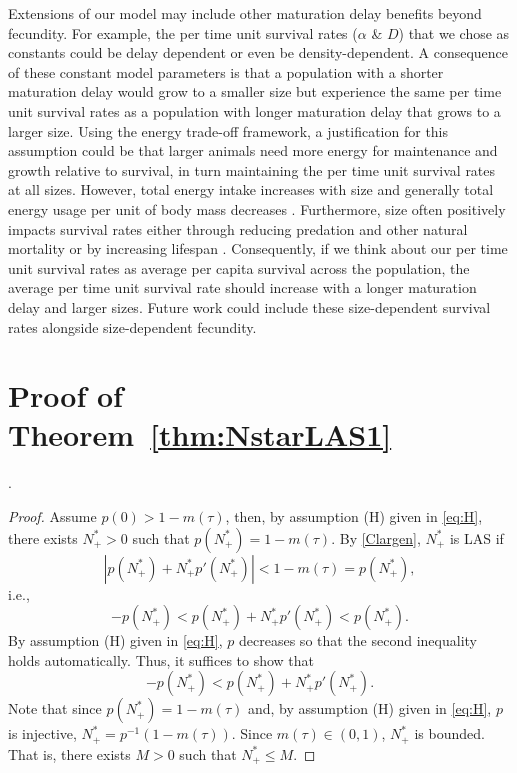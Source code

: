 \documentclass{article}
\numberwithin{theorem}{section}
\begin{document}
{Extensions of our model may include other maturation delay benefits beyond fecundity. For example, the per time unit survival rates ($\alpha$ \& $D$) that we chose as constants could be delay dependent or even be density-dependent. A consequence of these constant model parameters is that a population with a shorter maturation delay would grow to a smaller size but experience the same per time unit survival rates as a population with longer maturation delay that grows to a larger size. Using the energy trade-off framework, a justification for this assumption could be that larger animals need more energy for maintenance and growth relative to survival, in turn maintaining the per time unit survival rates at all sizes. However, total energy intake increases with size and generally total energy usage per unit of body mass decreases \cite{marshallGlobalSynthesisOffspring2018}. Furthermore, size often positively impacts survival rates either through reducing predation and other natural mortality  \cite{gislasonSizeGrowthTemperature2010,trexlerEffectsHabitatBody1992} or by increasing lifespan \cite{speakmanBodySizeEnergy2005}. Consequently, if we think about our per time unit survival rates as average per capita survival across the population, the average per time unit survival rate should increase with a longer maturation delay and larger sizes. Future work could include these size-dependent survival rates alongside size-dependent fecundity.   


\appendix
\renewcommand{\thesection}{\Alph{section}}
\renewcommand{\thesubsection}{\Alph{section}.\arabic{subsection}}

\section{Proof of Theorem~\ref{thm:NstarLAS1}}\label{A:NstarLAS1}.

\begin{proof}
Assume $p(0)>1-m(\tau)$, then, by assumption (H) given in \eqref{eq:H}, there exists $N^*_+>0$ such that $p(N^*_+)=1-m(\tau)$. By \eqref{Clargen}, $N^*_+$ is LAS if 
\begin{equation}\label{LASXstar}
    \left|p(N^*_+)+N^*_+p'(N_+^*)\right|<1-m(\tau)=p(N^*_+),
\end{equation}
i.e., 
\begin{equation*}
-p(N^*_+)<p(N^*_+)+N^*_+p'(N_+^*)<p(N^*_+).
\end{equation*}
By assumption (H) given in \eqref{eq:H}, $p$ decreases so that the second inequality holds automatically. Thus, it suffices to show that 
$$-p(N^*_+)<p(N^*_+)+N^*_+p'(N^*_+).$$
Note that since $p(N^*_+)=1-m(\tau)$ and, by assumption (H) given in \eqref{eq:H}, $p$ is injective, $N^*_+=p^{-1}(1-m(\tau))$. Since $m(\tau)\in (0,1)$, $N^*_+$ is bounded. That is, there exists $M>0$ such that $N^*_+\leq M$. 


\end{proof}}
\end{document}
